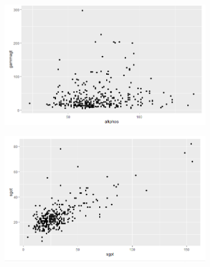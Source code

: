 \begin{figure}[!tbh]
	\medskip
	
	\begin{subfigure}{0.5\textwidth}
	\includegraphics[width=1\linewidth]{figures/tesis_7}
\caption{}
\label{fig:tesis7}
	\end{subfigure}\hfil %
	\begin{subfigure}{0.5\textwidth}
	\includegraphics[width=1\linewidth]{figures/tesis_8}
\caption{}
\label{fig:tesis8}
	\end{subfigure}\hfil %

	\medskip


\end{figure}
